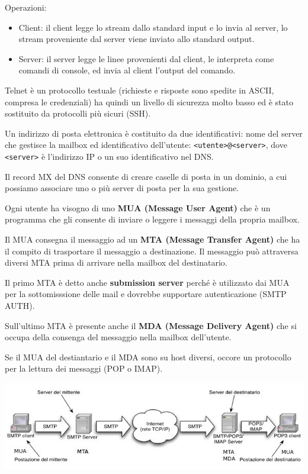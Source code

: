         Operazioni:
        \begin{itemize}
            \item Client: il client legge lo stream dallo standard input e lo invia al server, lo stream proveniente dal server viene inviato allo standard output.
            \item Server: il server legge le linee provenienti dal client, le interpreta come comandi di console, ed invia al client l'output del comando.            
        \end{itemize}

        Telnet è un protocollo testuale (richieste e risposte sono spedite in ASCII, compresa le credenziali) ha quindi un livello di sicurezza molto basso ed è stato sostituito da protocolli più sicuri (SSH).

        Un indirizzo di posta elettronica è costituito da due identificativi: nome del server che gestisce la mailbox ed identificativo dell'utente: \verb:<utente>@<server>:, dove \verb:<server>: è l'indirizzo IP o un suo identificativo nel DNS.

        Il record MX del DNS consente di creare caselle di posta in un dominio, a cui possiamo associare uno o più server di posta per la sua gestione.

        Ogni utente ha visogno di uno \textbf{MUA (Message User Agent)} che è un programma che gli consente di inviare o leggere i messaggi della propria mailbox.

        Il MUA consegna il messaggio ad un \textbf{MTA (Message Transfer Agent)} che ha il compito di trasportare il messaggio a destinazione. Il messaggio può attraversa diversi MTA prima di arrivare nella mailbox del destinatario.

        Il primo MTA è detto anche \textbf{submission server} perché è utilizzato dai MUA per la sottomisssione delle mail e dovrebbe supportare autenticazione (SMTP AUTH).

        Sull'ultimo MTA è presente anche il \textbf{MDA (Message Delivery Agent)} che si occupa della consenga del messaggio nella mailbox dell'utente.

        Se il MUA del destiantario e il MDA sono su host diversi, occore un protocollo per la lettura dei messaggi (POP o IMAP).

        \begin{center}
            \includegraphics[scale=0.41]{chapters/6/assets/schema_f.png}
        \end{center}

